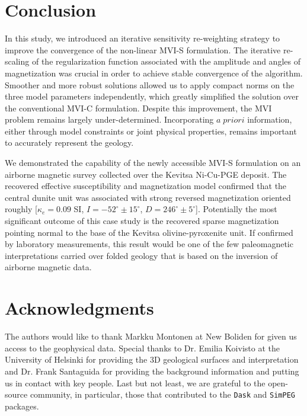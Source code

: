 \documentclass[paper]{geophysics}
\begin{document}
\section{Conclusion}
In this study, we introduced an iterative sensitivity re-weighting strategy to improve the convergence of the non-linear MVI-S formulation.
The iterative re-scaling of the regularization function associated with the amplitude and angles of magnetization was crucial in order to achieve stable convergence of the algorithm.
Smoother and more robust solutions allowed us to apply compact norms on the three model parameters independently, which greatly simplified the solution over the conventional MVI-C formulation. Despite this improvement, the MVI problem remains largely under-determined. Incorporating $a \; priori$ information, either through model constraints or joint physical properties, remains important to accurately represent the geology.

We demonstrated the capability of the newly accessible MVI-S formulation on an airborne magnetic survey collected over the Kevitsa Ni-Cu-PGE deposit. The recovered effective susceptibility and magnetization model confirmed that the central dunite unit was associated with strong reversed magnetization oriented roughly [$\kappa_{e} = 0.09$ SI, $I=-52^\circ \pm 15^\circ$, $D=246^\circ \pm 5^\circ$].
Potentially the most significant outcome of this case study is the recovered sparse magnetization pointing normal to the base of the Kevitsa olivine-pyroxenite unit. If confirmed by laboratory measurements, this result would be one of the few paleomagnetic interpretations carried over folded geology that is based on the inversion of airborne magnetic data.

\section{Acknowledgments}
The authors would like to thank Markku Montonen at New Boliden for given us access to the geophysical data. Special thanks to Dr. Emilia Koivisto at the University of Helsinki for providing the 3D geological surfaces and interpretation and Dr. Frank Santaguida for providing the background information and putting us in contact with key people. Last but not least, we are grateful to the open-source community, in particular, those that contributed to the \texttt{Dask} and \texttt{SimPEG} packages.

\pagebreak

% 

\end{document}
